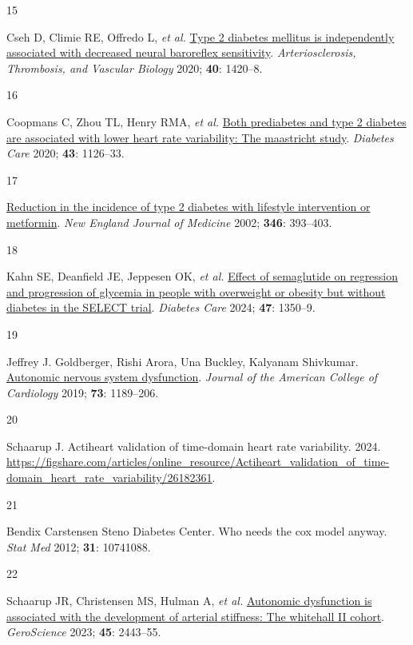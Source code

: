 \documentclass[
  a4paper,
  headsepline=true,
  open=any]{scrbook}
\newlength{\cslhangindent}
\newlength{\csllabelwidth}
\newlength{\cslentryspacingunit} %
\newenvironment{CSLReferences}[2] %
 {%
  \setlength{\parindent}{0pt}
  \ifodd #1
  \let\oldpar\par
  \def\par{\hangindent=\cslhangindent\oldpar}
  \fi
  \setlength{\parskip}{#2\cslentryspacingunit}
 }%
 {}
\newcommand{\CSLLeftMargin}[1]{\parbox[t]{\csllabelwidth}{#1}}
\newcommand{\CSLRightInline}[1]{\parbox[t]{\linewidth - \csllabelwidth}{#1}\break}
\begin{document}
\begin{CSLReferences}{0}{0}
\leavevmode{}%
\CSLLeftMargin{15 }%
\CSLRightInline{Cseh D, Climie RE, Offredo L, \emph{et al.}
\href{https://doi.org/10.1161/ATVBAHA.120.314102}{Type 2 diabetes
mellitus is independently associated with decreased neural baroreflex
sensitivity}. \emph{Arteriosclerosis, Thrombosis, and Vascular Biology}
2020; \textbf{40}: 1420--8.}

\leavevmode{}%
\CSLLeftMargin{16 }%
\CSLRightInline{Coopmans C, Zhou TL, Henry RMA, \emph{et al.}
\href{https://doi.org/10.2337/dc19-2367}{Both prediabetes and type 2
diabetes are associated with lower heart rate variability: The
maastricht study}. \emph{Diabetes Care} 2020; \textbf{43}: 1126--33.}

\leavevmode{}%
\CSLLeftMargin{17 }%
\CSLRightInline{\href{https://doi.org/10.1056/NEJMoa012512}{Reduction in
the incidence of type 2 diabetes with lifestyle intervention or
metformin}. \emph{New England Journal of Medicine} 2002; \textbf{346}:
393--403.}

\leavevmode{}%
\CSLLeftMargin{18 }%
\CSLRightInline{Kahn SE, Deanfield JE, Jeppesen OK, \emph{et al.}
\href{https://doi.org/10.2337/dc24-0491}{Effect of semaglutide on
regression and progression of glycemia in people with overweight or
obesity but without diabetes in the SELECT trial}. \emph{Diabetes Care}
2024; \textbf{47}: 1350--9.}

\leavevmode{}%
\CSLLeftMargin{19 }%
\CSLRightInline{Jeffrey J. Goldberger, Rishi Arora, Una Buckley,
Kalyanam Shivkumar.
\href{https://doi.org/doi:10.1016/j.jacc.2018.12.064}{Autonomic nervous
system dysfunction}. \emph{Journal of the American College of
Cardiology} 2019; \textbf{73}: 1189--206.}

\leavevmode{}%
\CSLLeftMargin{20 }%
\CSLRightInline{Schaarup J. Actiheart validation of time-domain heart
rate variability. 2024.
\url{https://figshare.com/articles/online_resource/Actiheart_validation_of_time-domain_heart_rate_variability/26182361}.}

\leavevmode{}%
\CSLLeftMargin{21 }%
\CSLRightInline{Bendix Carstensen Steno Diabetes Center. Who needs the
cox model anyway. \emph{Stat Med} 2012; \textbf{31}: 10741088.}

\leavevmode{}%
\CSLLeftMargin{22 }%
\CSLRightInline{Schaarup JR, Christensen MS, Hulman A, \emph{et al.}
\href{https://doi.org/10.1007/s11357-023-00762-0}{Autonomic dysfunction
is associated with the development of arterial stiffness: The whitehall
II cohort}. \emph{GeroScience} 2023; \textbf{45}: 2443--55.}


\end{CSLReferences}
\end{document}
